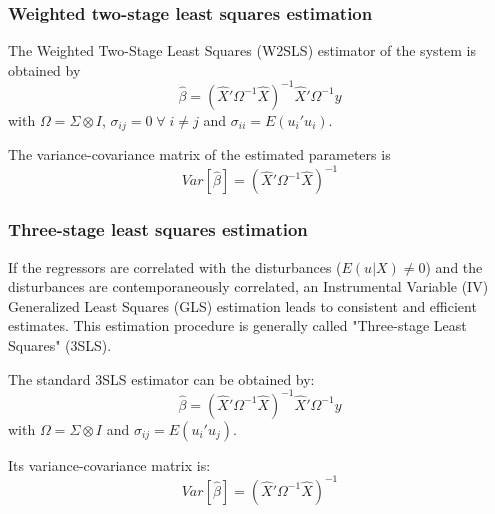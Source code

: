 \documentclass[article]{jss}
\begin{document}
\subsubsection{Weighted two-stage least squares estimation}

The Weighted Two-Stage Least Squares (W2SLS) estimator of the system 
is obtained by
\begin{equation}
   \widehat{\beta} = \left( \widehat{X}' \Omega^{-1} \widehat{X} 
   \right)^{-1} \widehat{X}' \Omega^{-1} y
\end{equation}
with $\Omega = \Sigma \otimes I$, 
$\sigma_{ij} = 0 \; \forall \; i \neq j$ and
$\sigma_{ii} = E \left( u_i' u_i \right)$.

The variance-covariance matrix of the estimated parameters is
\begin{equation}
   Var \left[ \widehat{\beta} \right] = \left( \widehat{X}' \Omega^{-1} 
   \widehat{X} \right)^{-1}
\end{equation}


\subsubsection{Three-stage least squares estimation}

If the regressors are correlated with the disturbances 
($E \left( u | X \right) \neq 0$) and 
the disturbances are contemporaneously correlated, 
an Instrumental Variable (IV) Generalized Least Squares (GLS) 
estimation leads to consistent and efficient estimates. This estimation 
procedure is generally called "Three-stage Least Squares" (3SLS). 

The standard 3SLS estimator can be obtained by:
\begin{equation}
   \widehat{\beta} = \left( \widehat{X}' \Omega^{-1} \widehat{X} 
   \right)^{-1} \widehat{X}' \Omega^{-1} y
\end{equation}
with $\Omega = \Sigma \otimes I$ and
$\sigma_{ij} = E \left( u_i' u_j \right)$.

Its variance-covariance matrix is:
\begin{equation}
   Var \left[ \widehat{\beta} \right] = \left( \widehat{X}' \Omega^{-1} 
   \widehat{X} \right)^{-1}
   \label{eq:cov3sls}
\end{equation}
\end{document}
